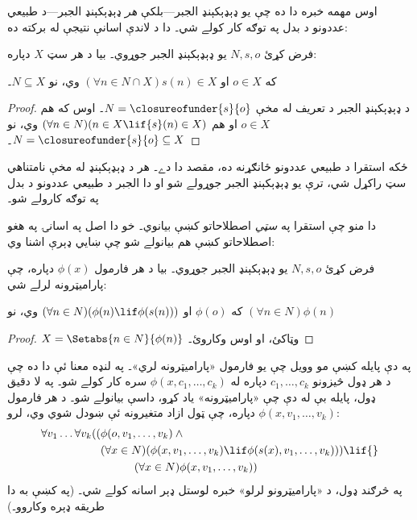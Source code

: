 \documentclass[../../../include/open-logic-section]{subfiles}
\begin{document}

اوس مهمه خبره دا ده چې يو ډېډېکېنډ الجبر---بلکې \emph{هر}
ډېډېکېنډ الجبر---د طبيعي عددونو د بدل په توګه کار کولے شي۔ دا د
لاندې اسانې نتيجې له برکته ده:

\begin{thm}
فرض کړئ $N, s, o$ يو ډېډېکېنډ الجبر جوړوي۔ بيا د هر سټ $X$ دپاره:
	\begin{center}
		که $o \in X$ او $(\forall {n} \in N \cap X){s}({n}) \in X$ وي، {نو} $N \subseteq X$۔
	\end{center}
\end{thm}

\begin{proof}
د ډېډېکېنډ الجبر د تعريف له مخې $N = \closureofunder{s}{o}$۔ اوس
که هم ${o} \in X$ او هم $(\forall {n} \in N)(n \in X \lif
{s}({n}) \in X)$ وي، نو $N = \closureofunder{s}{o} \subseteq X$۔
\end{proof}

ځکه استقرا د طبيعي عددونو ځانګړنه ده، مقصد دا دے۔ هر د ډېډېکېنډ
له مخې نامتناهي سټ راکړل شي، ترې يو ډېډېکېنډ الجبر جوړولے شو او دا
الجبر د طبيعي عددونو د بدل په توګه کارولے شو۔

دا منو چې  استقرا په \emph{سټي}
اصطلاحاتو کښې بيانوي۔ خو دا اصل په اسانۍ په هغو اصطلاحاتو کښې هم
بيانولے شو چې ښايي ډېرې اشنا وي:

\begin{cor}
فرض کړئ $N, s, o$ يو ډېډېکېنډ الجبر جوړوي۔ بيا د هر فارمول
$\phi(x)$ دپاره، چې پاراميټرونه لرلے شي:
\begin{center}
	که $\phi(o)$ او $(\forall {n} \in N)(\phi(n)\lif
	\phi({s}({n})))$ وي، {نو} $(\forall n \in N)\phi(n)$
\end{center}
\end{cor}

\begin{proof}
$X = \Setabs{n \in N}{\phi(n)}$ وټاکئ، او اوس
 وکاروئ۔
\end{proof}

په دې پايله کښې مو وويل چې يو فارمول «پاراميټرونه لري»۔ په لنډه
معنا ئې دا ده چې د هر ډول څيزونو $c_1, \ldots, c_k$ دپاره له
$\phi(x, c_1, \ldots, c_k)$ سره کار کولے شو۔ په لا دقيق ډول، پايله
بې له دې چې «پاراميټرونه» ياد کړو، داسې بيانولے شو۔ د هر فارمول
$\phi(x, v_1, \ldots, v_k)$ دپاره، چې ټول ازاد متغيرونه ئې ښودل
شوي وي، لرو:
	\begin{align*}
			\forall v_1 \ldots \forall v_k((&\phi(o, v_1,\ldots, v_k) \land {}\\
			&	(\forall x \in N)(\phi(x,v_1, \ldots, v_k) \lif \phi(s(x), v_1,\ldots, v_k))) \lif {}\\
			&\hspace{3em} (\forall x \in N)\phi(x, v_1,\ldots, v_k))
	\end{align*}
په څرګند ډول، د «پاراميټرونو لرلو» خبره لوستل ډېر اسانه کولے شي۔
(په  کښې به دا طريقه ډېره وکاروو۔)
\end{document}
